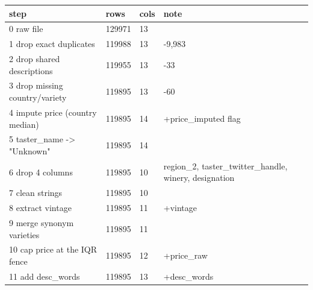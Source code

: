 \begin{tabular}{llll}
\toprule
\textbf{step} & \textbf{rows} & \textbf{cols} & \textbf{note} \\
\midrule
0 raw file & 129971 & 13 &  \\
1 drop exact duplicates & 119988 & 13 & -9,983 \\
2 drop shared descriptions & 119955 & 13 & -33 \\
3 drop missing country/variety & 119895 & 13 & -60 \\
4 impute price (country median) & 119895 & 14 & +price\_imputed flag \\
5 taster\_name -> "Unknown" & 119895 & 14 &  \\
6 drop 4 columns & 119895 & 10 & region\_2, taster\_twitter\_handle, winery, designation \\
7 clean strings & 119895 & 10 &  \\
8 extract vintage & 119895 & 11 & +vintage \\
9 merge synonym varieties & 119895 & 11 &  \\
10 cap price at the IQR fence & 119895 & 12 & +price\_raw \\
11 add desc\_words & 119895 & 13 & +desc\_words \\
\bottomrule
\end{tabular}
